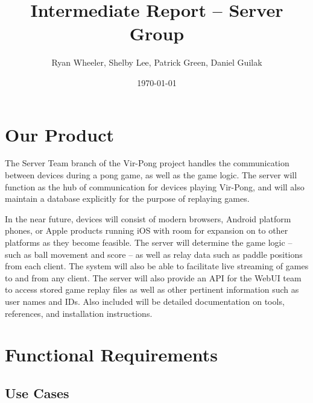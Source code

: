 \documentclass[letterpaper,12pt]{article}
\begin{document}
\title{Intermediate Report -- Server Group}
\author{Ryan Wheeler, Shelby Lee, Patrick Green, Daniel Guilak}
\date{\today}
\maketitle
\newpage

\tableofcontents
\newpage

\section{Our Product}
The Server Team branch of the Vir-Pong project handles the communication between devices during a pong game, as well as the game logic. The server will function as the hub of communication for devices playing Vir-Pong, and will also maintain a database explicitly for the purpose of replaying games.

In the near future, devices will consist of modern browsers, Android platform phones, or Apple products running iOS with room for expansion on to other platforms as they become feasible. The server will determine the game logic -- such as ball movement and score -- as well as relay data such as paddle positions from each client. The system will also be able to facilitate live streaming of games to and from any client. The server will also provide an API for the WebUI team to access stored game replay files as well as other pertinent information such as user names and IDs. Also included will be detailed documentation on tools, references, and installation instructions.

\section{Functional Requirements}

\subsection{Use Cases}
\end{document}
